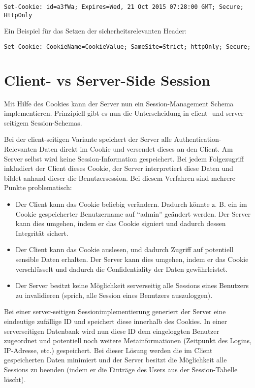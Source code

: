 \begin{verbatim}
Set-Cookie: id=a3fWa; Expires=Wed, 21 Oct 2015 07:28:00 GMT; Secure; HttpOnly
\end{verbatim}

Ein Beispiel für das Setzen der sicherheitsrelevanten Header:

\begin{verbatim}
Set-Cookie: CookieName=CookieValue; SameSite=Strict; httpOnly; Secure;
\end{verbatim}

\section{Client- vs Server-Side Session}

Mit Hilfe des Cookies kann der Server nun ein Session-Management Schema implementieren. Prinzipiell gibt es nun die Unterscheidung in client- und server-seitigem Session-Schemas.

Bei der client-seitigen Variante speichert der Server alle Authentication-Relevanten Daten direkt im Cookie und versendet dieses an den Client. Am Server selbst wird keine Session-Information gespeichert. Bei jedem Folgezugriff inkludiert der Client dieses Cookie, der Server interpretiert diese Daten und bildet anhand dieser die Benutzersession. Bei diesem Verfahren sind mehrere Punkte problematisch:

\begin{itemize}
		\item Der Client kann das Cookie beliebig verändern. Dadurch könnte z. B. ein im Cookie gespeicherter Benutzername auf ``admin'' geändert werden. Der Server kann dies umgehen, indem er das Cookie signiert und dadurch dessen Integrität sichert.
	\item Der Client kann das Cookie auslesen, und dadurch Zugriff auf potentiell sensible Daten erhalten. Der Server kann dies umgehen, indem er das Cookie verschlüsselt und dadurch die Confidentiality der Daten gewährleistet.
	\item Der Server besitzt keine Möglichkeit serverseitig alle Sessions eines Benutzers zu invalidieren (sprich, alle Session eines Benutzers auszuloggen).
\end{itemize}

Bei einer server-seitigen Sessionimplementierung generiert der Server eine eindeutige zufällige ID und speichert diese innerhalb des Cookies. In einer serverseitigen Datenbank wird nun diese ID dem eingeloggten Benutzer zugeordnet und potentiell noch weitere Metainformationen (Zeitpunkt des Logins, IP-Adresse, etc.) gespeichert. Bei dieser Lösung werden die im Client gespeicherten Daten minimiert und der Server besitzt die Möglichkeit alle Sessions zu beenden (indem er die Einträge des Users aus der Session-Tabelle löscht).

